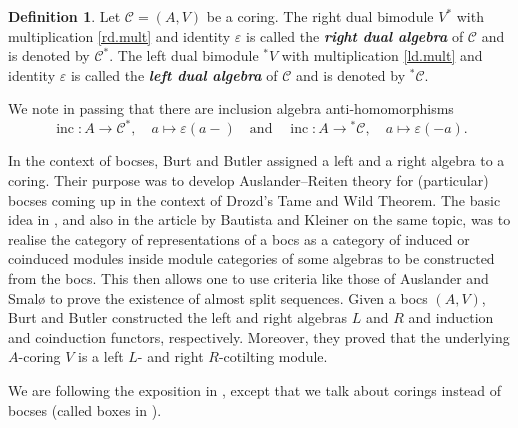 \documentclass[12pt,a4paper]{amsart}
\theoremstyle{plain}
\theoremstyle{definition}
\newtheorem{defn}[thm]{Definition}
\numberwithin{equation}{thm}
\newcommand{\emphbf}[1]{\emph{\textbf{#1}}}
\DeclareMathOperator{\incl}{inc}
\begin{document}
\begin{defn}\label{def.dual}
  Let $\mathcal{C}=(A,V)$ be a coring.
  The right dual bimodule $V^{\ast}$ with multiplication \eqref{rd.mult} and identity $\varepsilon$ is called the \emphbf{right dual algebra}  of $\mathcal{C}$ and is denoted by $ 
{\mathcal C}^{\ast}$.
 The left dual bimodule ${}^{\ast}V$ with multiplication \eqref{ld.mult} and identity $\varepsilon$ is called the \emphbf{left dual algebra}  of $\mathcal{C}$ and is denoted by $ 
{}^{\ast}{\mathcal C}$.
\end{defn}

We note in passing that there are inclusion algebra anti-homomorphisms 
\begin{equation}\label{inclusions}
    \incl\colon A \rightarrow {\mathcal C}^{\ast},\quad 
a \mapsto \varepsilon(a-)\quad  \mbox{and} \quad 
\incl\colon A \rightarrow {}^{\ast}{\mathcal C},\quad  a \mapsto
  \varepsilon(-a).
\end{equation}







In the context of bocses, Burt and Butler \cite{BB91} assigned a left and
a right algebra to a coring. Their purpose was to develop Auslander--Reiten theory for (particular) bocses coming up in the context of Drozd's
Tame and Wild Theorem. The basic idea in \cite{BB91}, and also in the article \cite{BK90} by Bautista and Kleiner on the same topic,
was to realise the category of
representations of a bocs as a category of induced or coinduced modules
inside module categories of some algebras to be constructed from the bocs.
This then allows one to use criteria like those of
Auslander and Smal{\o} \cite{AS81} to prove the existence of almost split sequences. Given
a bocs $(A,V)$, Burt and Butler constructed the left and right
algebras $L$ and $R$ and
induction and coinduction functors, respectively. Moreover, they
proved that the underlying $A$-coring $V$
is a left $L$- and right $R$-cotilting module.


We are following the exposition in
\cite[Section 10]{KKO14}, except that we talk about corings instead of
bocses (called boxes in \cite{KKO14}). 
\end{document}
